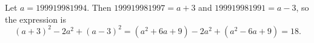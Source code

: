Let $a=199919981994$. Then $199919981997=a+3$ and $199919981991=a-3$, so the expression is
\[
(a+3)^2-2a^2+(a-3)^2=(a^2+6a+9)-2a^2+(a^2-6a+9)=\boxed{18}.
\]
